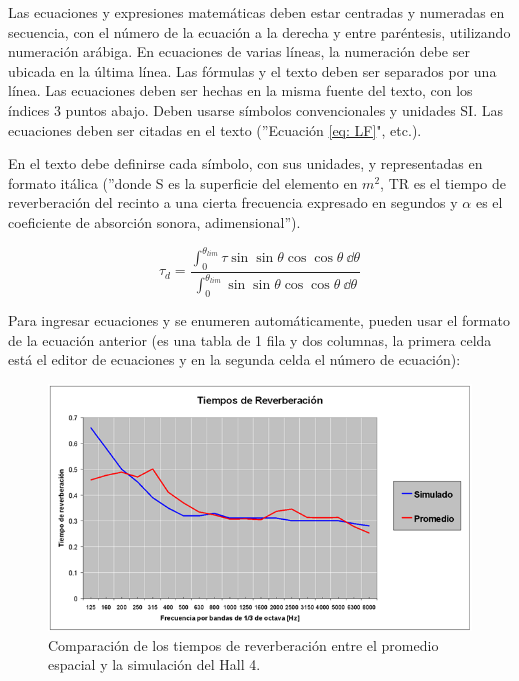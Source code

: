 Las ecuaciones y expresiones matemáticas deben estar centradas y numeradas en secuencia, con el número de la ecuación a la derecha y entre paréntesis, utilizando numeración arábiga. En ecuaciones de varias líneas, la numeración debe ser ubicada en la última línea. Las fórmulas y el texto deben ser separados por una línea. Las ecuaciones deben ser hechas en la misma fuente del texto, con los índices 3 puntos abajo. Deben usarse símbolos convencionales y unidades SI. Las ecuaciones deben ser citadas en el texto (''Ecuación \eqref{eq: LF}", etc.).

En el texto debe definirse cada símbolo, con sus unidades, y representadas en formato itálica (''donde S es la superficie del elemento en $m^2$, TR es el tiempo de reverberación del recinto a una cierta frecuencia expresado en segundos y $\alpha$ es el coeficiente de absorción sonora, adimensional”).

\begin{equation}
    \label{eq: LF}
    \tau_{d} = \frac{\int_{0}^{\theta_{lim}} \tau \sin \sin \theta \cos \cos \theta \ \dd \theta}{\int_{0}^{\theta_{lim}} \sin \sin \theta \cos \cos \theta \ \dd \theta}
\end{equation}

Para ingresar ecuaciones y se enumeren automáticamente, pueden usar el formato de la ecuación anterior (es una tabla de 1 fila y dos columnas, la primera celda está el editor de ecuaciones y en la segunda celda el número de ecuación): 


    \begin{figure}[h]
        \centering
        \includegraphics[scale=0.9]{figuras/Tiempo de Reverberacion.png}
        \caption{Comparación de los tiempos de reverberación entre el promedio espacial y la simulación del Hall 4.}
        \label{fig:Tiempo de reverberacion}
    \end{figure}

